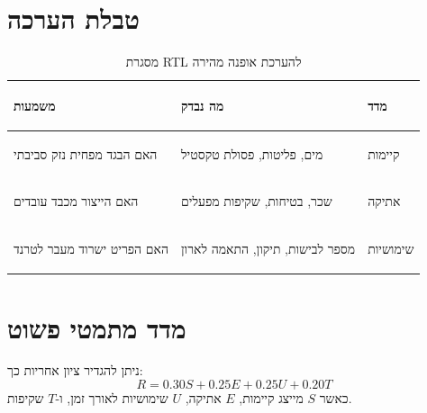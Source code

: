 \section{טבלת הערכה}
\begin{table}[!h]\centering\small\caption{מסגרת RTL להערכת אופנה מהירה}\begin{tabular}{|p{}|p{}|p{}|}\hline
 \begin{hebrew}\raggedleft משמעות\end{hebrew}  &  \begin{hebrew}\raggedleft מה נבדק\end{hebrew}  & \begin{hebrew}\raggedleft מדד\end{hebrew}  \\
\hline
 \begin{hebrew}\raggedleft האם הבגד מפחית נזק סביבתי\end{hebrew}  &  \begin{hebrew}\raggedleft מים, פליטות, פסולת טקסטיל\end{hebrew}  & \begin{hebrew}\raggedleft קיימות\end{hebrew}  \\
\hline
 \begin{hebrew}\raggedleft האם הייצור מכבד עובדים\end{hebrew}  &  \begin{hebrew}\raggedleft שכר, בטיחות, שקיפות מפעלים\end{hebrew}  & \begin{hebrew}\raggedleft אתיקה\end{hebrew}  \\
\hline
 \begin{hebrew}\raggedleft האם הפריט ישרוד מעבר לטרנד\end{hebrew}  &  \begin{hebrew}\raggedleft מספר לבישות, תיקון, התאמה לארון\end{hebrew}  & \begin{hebrew}\raggedleft שימושיות\end{hebrew}  \\
\hline
\end{tabular}\end{table}

\section{מדד מתמטי פשוט}
ניתן להגדיר ציון אחריות כך: \[R=0.30S+0.25E+0.25U+0.20T\] כאשר \(S\) מייצג קיימות, \(E\) אתיקה, \(U\) שימושיות לאורך זמן, ו-\(T\) שקיפות.


